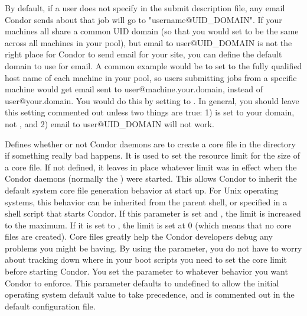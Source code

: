 \begin{description}
\label{param:EmailDomain}
\item[\Macro{EMAIL\_DOMAIN}]
  By default, if a user does not specify  in the
  submit description file, any email Condor sends about that job will
  go to "username@UID\_DOMAIN".
  If your machines all share a common UID domain (so that you would
  set  to be the same across all machines in your
  pool), but email to user@UID\_DOMAIN is not the right place for
  Condor to send email for your site, you can define the default
  domain to use for email.
  A common example would be to set  to the fully
  qualified host name of each machine in your pool, so users submitting
  jobs from a specific machine would get email sent to
  user@machine.your.domain, instead of user@your.domain.  
  You would do this by setting  to
  . 
  In general, you should leave this setting commented out unless two
  things are true: 1)  is set to your domain, not
  , and 2) email to user@UID\_DOMAIN will not 
  work. 
  
\label{param:CreateCoreFiles}
\item[\Macro{CREATE\_CORE\_FILES}]
  Defines whether or not Condor daemons are to
  create a core file in the  directory
  if something really bad happens.  It is
  used to set
  the resource limit for the size of a core file.  If not defined,
  it leaves in place whatever limit was in effect
  when the Condor daemons (normally the ) were started.
  This allows Condor to inherit the default system core file generation
  behavior at start up.  For Unix operating systems, this behavior can
  be inherited from the parent shell, or specified in a shell script
  that starts Condor.
  If this parameter is set and , the limit is increased to
  the maximum.  If it is set to , the limit is set at 0
  (which means that no core files are created).  Core files
  greatly help the Condor developers debug any problems you might be
  having.  By using the parameter, you do not have to worry about
  tracking down where in your boot scripts you need to set the core
  limit before starting Condor. You set the parameter
  to whatever behavior you want Condor to enforce.  This parameter
  defaults to undefined to allow the initial operating system default
  value to take precedence, 
  and is commented out in the default configuration file. 


\end{description}

